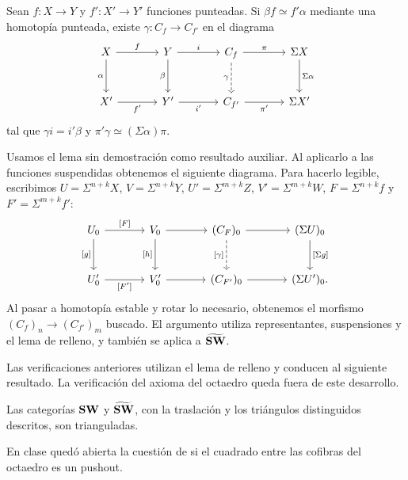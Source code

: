 \begin{lema}\label{lema:relleno}
Sean $f\colon X\to Y$ y $f'\colon X'\to Y'$ funciones punteadas. Si $\beta f\simeq f'\alpha$ mediante una homotopía punteada, existe $\gamma\colon C_f\to C_{f'}$ en el diagrama
\[
\begin{tikzcd}[column sep=large,row sep=large]
X \arrow[r,"f"] \arrow[d,"\alpha"'] & Y \arrow[r,"i"] \arrow[d,"\beta"'] & C_f \arrow[r,"\pi"] \arrow[d,dashed,"\gamma"'] & \Sigma X \arrow[d,"\Sigma\alpha"]\\
X' \arrow[r,"f'"'] & Y' \arrow[r,"i'"'] & C_{f'} \arrow[r,"\pi'"'] & \Sigma X'
\end{tikzcd}
\]
tal que $\gamma i=i'\beta$ y $\pi'\gamma\simeq(\Sigma\alpha)\pi$.
\end{lema}

Usamos el lema sin demostración como resultado auxiliar. Al aplicarlo a las funciones suspendidas obtenemos el siguiente diagrama. Para hacerlo legible, escribimos $U=\Sigma^{n+k}X$, $V=\Sigma^{n+k}Y$, $U'=\Sigma^{m+k}Z$, $V'=\Sigma^{m+k}W$, $F=\Sigma^{n+k}f$ y $F'=\Sigma^{m+k}f'$:
\[
\begin{tikzcd}[column sep=large,row sep=large]
U_0 \arrow[r,"{[F]}"] \arrow[d,"{[g]}"'] & V_0 \arrow[r] \arrow[d,"{[h]}"'] & (C_F)_0 \arrow[r] \arrow[d,dashed,"{[\gamma]}"'] & (\Sigma U)_0 \arrow[d,"{[\Sigma g]}"]\\
U'_0 \arrow[r,"{[F']}"'] & V'_0 \arrow[r] & (C_{F'})_0 \arrow[r] & (\Sigma U')_0.
\end{tikzcd}
\]
Al pasar a homotopía estable y rotar lo necesario, obtenemos el morfismo $(C_f)_n\to(C_{f'})_m$ buscado. El argumento utiliza representantes, suspensiones y el lema de relleno, y también se aplica a $\widetilde{\mathbf{SW}}$.

Las verificaciones anteriores utilizan el lema de relleno y conducen al siguiente resultado. La verificación del axioma del octaedro queda fuera de este desarrollo.

\begin{teo}\label{teo:triangulada}
Las categorías $\mathbf{SW}$ y $\widetilde{\mathbf{SW}}$, con la traslación y los triángulos distinguidos descritos, son trianguladas.
\end{teo}

\begin{nota}
En clase quedó abierta la cuestión de si el cuadrado entre las cofibras del octaedro es un pushout.
\end{nota}
